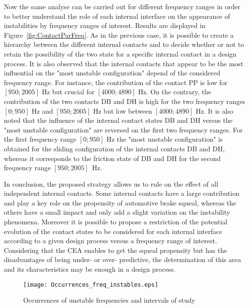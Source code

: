 \documentclass[final,1p]{elsarticle}
\begin{document}
Now the same analyse can be carried out for different frequency ranges in order to better understand the role of each internal interface on the appearance of instabilities by frequency ranges of interest. Results are displayed in Figure~\ref{fig:ContactParFreq}. As in the previous case, it is possible to create a hierarchy between the different internal contacts and to decide whether or not to retain the possibility of the two state for a specific internal contact in a design process. It is also observed that the internal contacts that appear to be the most influential on the "most unstable configuration" depend of the considered frequency range. For instance, the contribution of the contact PP is low for $[950;2005]$ Hz but crucial for $[4000;4890]$ Hz. On the contrary, the contribution of the two contacts DB and DH is high for the two frequency ranges  $[0;950]$ Hz and $[950;2005]$ Hz but low between $[4000;4890]$ Hz. It is also noted that the influence of the internal contact states DB and DH  versus the "most unstable configuration" are reversed on the first two frequency ranges. For the first frequency range $[0; 950]$ Hz the "most unstable configuration" is obtained for the sliding configuration of the internal contacts DB and DH, whereas it corresponds to the friction state of DB and DH for the second frequency range $[950;2005]$~Hz.

In conclusion, the proposed strategy allows us to rule on the effect of all independent internal contacts. Some internal contacts have a large contribution and play a key role on the propensity of automotive brake squeal, whereas the others have a small impact and only add a slight variation on the instability phenomena. Moreover it is possible to propose a restriction of the potential evolution of the contact states to be considered for each internal interface according to a given design process versus a frequency range of interest. Considering that the CEA enables to get the squeal propensity but has the disadvantages of being under- or over- predictive, the determination of this area and its characteristics may be enough in a design process. 

\begin{figure}[h!]
\hspace{-3.5cm}
\texttt{[image: Occurrences\_freq\_instables.eps]}
\caption{Occurrences of unstable frequencies and intervals of study}
\label{fig:OccFreqIns}
\end{figure}
\end{document}
